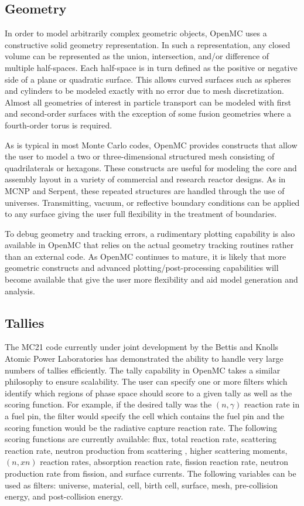 \documentclass[authoryear,preprint]{elsarticle}
\begin{document}
\subsection{Geometry}

In order to model arbitrarily complex geometric objects, OpenMC uses a
constructive solid geometry representation. In such a representation, any closed
volume can be represented as the union, intersection, and/or difference of
multiple half-spaces. Each half-space is in turn defined as the positive or
negative side of a plane or quadratic surface. This allows curved surfaces such
as spheres and cylinders to be modeled exactly with no error due to mesh
discretization. Almost all geometries of interest in particle transport can be
modeled with first and second-order surfaces with the exception of some fusion
geometries where a fourth-order torus is required.

As is typical in most Monte Carlo codes, OpenMC provides constructs that allow
the user to model a two or three-dimensional structured mesh consisting of
quadrilaterals or hexagons. These constructs are useful for modeling the core
and assembly layout in a variety of commercial and research reactor designs. As
in MCNP and Serpent, these repeated structures are handled through the use of
universes. Transmitting, vacuum, or reflective boundary conditions can be
applied to any surface giving the user full flexibility in the treatment of
boundaries.

To debug geometry and tracking errors, a rudimentary plotting capability is also
available in OpenMC that relies on the actual geometry tracking routines rather
than an external code. As OpenMC continues to mature, it is likely that more
geometric constructs and advanced plotting/post-processing capabilities will
become available that give the user more flexibility and aid model generation
and analysis.

\subsection{Tallies}
\label{sec:tallies}


The MC21 code currently under joint development by the Bettis and Knolls Atomic
Power Laboratories \citep{mc21} has demonstrated the ability to handle very
large numbers of tallies efficiently. The tally capability in OpenMC takes a
similar philosophy to ensure scalability. The user can specify one or more
filters which identify which regions of phase space should score to a given
tally as well as the scoring function. For example, if the desired tally was the
$(n,\gamma)$ reaction rate in a fuel pin, the filter would specify the cell
which contains the fuel pin and the scoring function would be the radiative
capture reaction rate. The following scoring functions are currently available:
flux, total reaction rate, scattering reaction rate, neutron production from
scattering \citep{herman}, higher scattering moments, $(n,xn)$ reaction rates,
absorption reaction rate, fission reaction rate, neutron production rate from
fission, and surface currents. The following variables can be used as filters:
universe, material, cell, birth cell, surface, mesh, pre-collision energy, and
post-collision energy.
\end{document}
